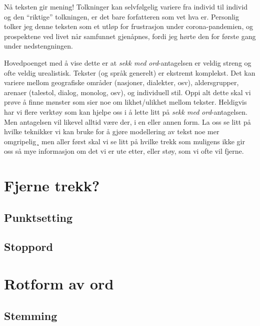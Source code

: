 \documentclass[
]{book}
\begin{document}
Nå teksten gir mening! Tolkninger kan selvfølgelig variere fra individ til individ og den ``riktige'' tolkningen, er det bare forfatteren som vet hva er. Personlig tolker jeg denne teksten som et utløp for frustrasjon under corona-pandemien, og prospektene ved livet når samfunnet gjenåpnes, fordi jeg hørte den for første gang under nedstengningen.

Hovedpoenget med å vise dette er at \emph{sekk med ord}-antagelsen er veldig streng og ofte veldig urealistisk. Tekster (og språk generelt) er ekstremt komplekst. Det kan variere mellom geografiske områder (nasjoner, dialekter, osv), aldersgrupper, arenaer (talestol, dialog, monolog, osv), og individuell stil. Oppi alt dette skal vi prøve å finne mønster som sier noe om likhet/ulikhet mellom tekster. Heldigvis har vi flere verktøy som kan hjelpe oss i å lette litt på \emph{sekk med ord}-antagelsen. Men antagelsen vil likevel alltid være der, i en eller annen form. La oss se litt på hvilke teknikker vi kan bruke for å gjøre modellering av tekst noe mer omgripelig¸ men aller først skal vi se litt på hvilke trekk som muligens ikke gir oss så mye informasjon om det vi er ute etter, eller støy, som vi ofte vil fjerne.

\hypertarget{fjerne-trekk}{%
\section{Fjerne trekk?}\label{fjerne-trekk}}

\hypertarget{punktsetting}{%
\subsection{Punktsetting}\label{punktsetting}}

\hypertarget{stoppord}{%
\subsection{Stoppord}\label{stoppord}}

\hypertarget{rotform-av-ord}{%
\section{Rotform av ord}\label{rotform-av-ord}}

\hypertarget{stemming}{%
\subsection{Stemming}\label{stemming}}
\end{document}
